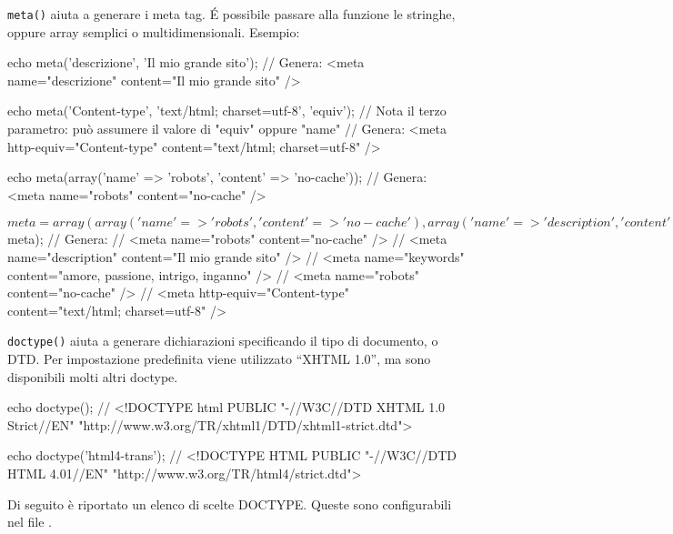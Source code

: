 \verb|meta()| aiuta a generare i meta tag. \'E possibile passare alla funzione  le stringhe, oppure array semplici o multidimensionali. Esempio:

\begin{code}
echo meta('descrizione', 'Il mio grande sito');
// Genera: <meta name="descrizione" content="Il mio grande sito" />


echo meta('Content-type', 'text/html; charset=utf-8', 'equiv'); // Nota il terzo parametro: può assumere il valore di "equiv" oppure "name"
// Genera: <meta http-equiv="Content-type" content="text/html; charset=utf-8" />


echo meta(array('name' => 'robots', 'content' => 'no-cache'));
// Genera: <meta name="robots" content="no-cache" />


$meta = array(
        array('name' => 'robots', 'content' => 'no-cache'),
        array('name' => 'description', 'content' => 'Il mio grande sito'),
        array('name' => 'keywords', 'content' => 'amore, passione, intrigo, inganno'),
        array('name' => 'robots', 'content' => 'no-cache'),
        array('name' => 'Content-type', 'content' => 'text/html; charset=utf-8', 'type' => 'equiv')
    );

echo meta($meta); 
// Genera: 
// <meta name="robots" content="no-cache" />
// <meta name="description" content="Il mio grande sito" />
// <meta name="keywords" content="amore, passione, intrigo, inganno" />
// <meta name="robots" content="no-cache" />
// <meta http-equiv="Content-type" content="text/html; charset=utf-8" />
\end{code}

\verb|doctype()| aiuta a generare dichiarazioni specificando il tipo di documento, o DTD. Per impostazione predefinita viene utilizzato ``XHTML 1.0'', ma sono disponibili molti altri doctype.

\begin{code}
echo doctype();
// <!DOCTYPE html PUBLIC "-//W3C//DTD XHTML 1.0 Strict//EN" "http://www.w3.org/TR/xhtml1/DTD/xhtml1-strict.dtd">

echo doctype('html4-trans');
// <!DOCTYPE HTML PUBLIC "-//W3C//DTD HTML 4.01//EN" "http://www.w3.org/TR/html4/strict.dtd">
\end{code}

Di seguito è riportato un elenco di scelte DOCTYPE. Queste sono configurabili nel file .
%

